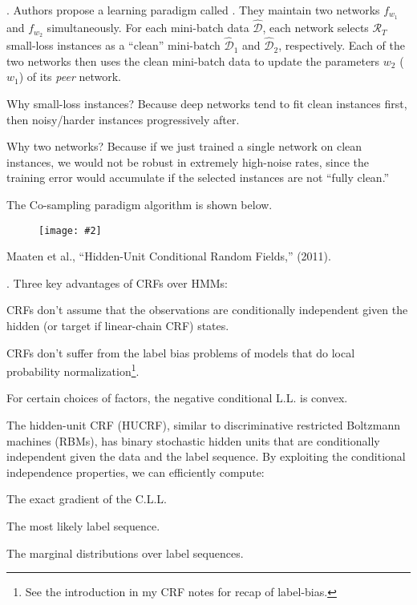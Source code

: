 \documentclass[11pt]{article}
\newcommand\myfig[2][0.3\textwidth]{\begin{figure}[h!]\centering\texttt{[image: \#2]}\end{figure}}
\newcommand\myspace[1][]{\vspace{#1\bigskipamount}}
\newcommand\p{\Needspace{10\baselineskip} \noindent}
\begin{document}
\myspace
\p {}. Authors propose a learning paradigm called . They maintain two networks $f_{w_1}$ and $f_{w_2}$ simultaneously. For each mini-batch data $\hat{\mathcal D}$, each network selects $\mathcal{R}_T$ small-loss instances as a ``clean'' mini-batch $\hat{\mathcal D}_1$ and $\hat{\mathcal D}_2$, respectively. Each of the two networks then uses the clean mini-batch data to update the parameters $w_2$ ($w_1$) of its \textit{peer} network.
\begin{compactitem}
	\item Why small-loss instances? Because deep networks tend to fit clean instances first, then noisy/harder instances progressively after. 
	\item Why two networks? Because if we just trained a single network on clean instances, we would not be robust in extremely high-noise rates, since the training error would accumulate if the selected instances are not ``fully clean.''
\end{compactitem}
The Co-sampling paradigm algorithm is shown below.

\myfig[0.6\textwidth]{figs/cosampling_alg_1.png}





\vspace{-1em}
{\footnotesize Maaten et al., ``Hidden-Unit Conditional Random Fields,'' (2011).}

\p {}. Three key advantages of CRFs over HMMs:
\begin{compactenum}
	\item CRFs don't assume that the observations are conditionally independent given the hidden (or target if linear-chain CRF) states. 
	
	\item CRFs don't suffer from the label bias problems of models that do local probability normalization\footnote{See the introduction in my CRF notes for recap of label-bias.}. 
	
	\item For certain choices of factors, the negative conditional L.L. is convex. 
\end{compactenum}
The hidden-unit CRF (HUCRF), similar to discriminative restricted Boltzmann machines (RBMs), has binary stochastic hidden units that are conditionally independent given the data and the label sequence. By exploiting the conditional independence properties, we can efficiently compute:
\begin{compactenum}
	\item The exact gradient of the C.L.L. 
	
	\item The most likely label sequence. 
	
	\item The marginal distributions over label sequences. 
\end{compactenum}
\end{document}
